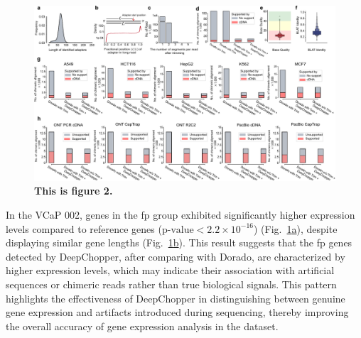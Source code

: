 \documentclass[pdflatex, sn-mathphys-num, lineno]{sn-jnl}%
\newcommand{\figref}[2]{Fig.~\hyperref[#1]{\ref*{#1}#2}}
\theoremstyle{thmstyleone}%
\theoremstyle{thmstyletwo}%
\theoremstyle{thmstylethree}%
\begin{document}
\begin{figure}[!h]
    \includegraphics[height=1.2\columnwidth]{figures/finals/figure2}
    \caption{\bf This is figure 2.}\label{fig:f2}
\end{figure}

In the VCaP 002, genes in the \gls{fp} group exhibited significantly higher expression levels compared to reference genes (\(\textrm{p-value} < 2.2 \times 10^{-16}\)) (\figref{fig:f2}{a}), despite displaying similar gene lengths (\figref{fig:f2}{b}).
This result suggests that the \gls{fp} genes detected by DeepChopper, after comparing with Dorado, are characterized by higher expression levels, which may indicate their association with artificial sequences or chimeric reads rather than true biological signals.
This pattern highlights the effectiveness of DeepChopper in distinguishing between genuine gene expression and artifacts introduced during sequencing, thereby improving the overall accuracy of gene expression analysis in the dataset.
\end{document}
